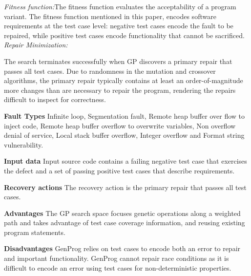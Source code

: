 \begin{compactitem}
\textit{Fitness function:}The fitness function evaluates the acceptability of a program variant. The fitness function mentioned in this paper, encodes software requirements at the test case level: negative test cases encode the fault to be repaired, while positive test cases encode functionality that cannot be sacrificed.\\

\textit{Repair Minimization:}

The search terminates successfully when GP discovers a primary repair that passes all test cases. Due to randomness in the mutation and crossover algorithms, the primary repair typically contains at least an order-of-magnitude more changes than are necessary to repair the program, rendering the repairs difficult to inspect for correctness.


\item[\textbf{Fault Types}]Infinite loop, Segmentation fault, Remote heap buffer over flow to inject code, Remote heap buffer overflow to overwrite variables, Non overflow denial of service, Local stack buffer overflow, Integer overflow and Format string vulnerability.

\item[\textbf{Input data}] Input source code contains a failing negative test case that exercises the defect and a set of passing positive test cases that describe requirements.

\item[\textbf{Recovery actions}]The recovery action is the primary repair that passes all test cases.

\item[\textbf{Advantages}] 
The GP search space focuses genetic operations along a weighted path and takes advantage of test case coverage information, and reusing existing program statements.

\item[\textbf{Disadvantages}] GenProg relies on test cases to encode both an error to repair and important functionality. GenProg cannot repair race conditions as it is difficult to encode an error using test cases for non-deterministic properties.


\end{compactitem}


